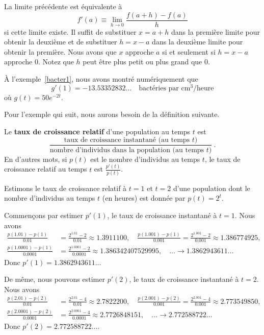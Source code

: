 {\begin{defn}
La limite précédente est équivalente à
\[
f'(a) \equiv \lim_{h\rightarrow 0} \frac{f(a+h) - f(a)}{h}
\]
si cette limite existe.  Il suffit de substituer $x=a+h$ dans la
première limite pour obtenir la deuxième et de substituer $h=x-a$ dans
la deuxième limite pour obtenir la première.  Nous avons que $x$
approche $a$ si et seulement si $h=x-a$ approche $0$.  Notez que $h$
peut être plus petit ou plus grand que $0$.
\end{defn}

\begin{egg}
À l'exemple~\ref{bacter1}, nous avons montré numériquement que
\[
g'(1) = -13.53352832\ldots \quad \text{bactéries par cm$^3$/heure}
\]
où $g(t) = 50 e^{-2t}$.
\end{egg}

Pour l'exemple qui suit, nous aurons besoin de la définition suivante.

\begin{defn} 
Le {\bfseries taux de croissance relatif} d'une population au temps
$t$ est
\[
\frac{\text{taux de croissance instantané (au temps $t$)}}
{\text{nombre d'individus dans la population (au temps $t$)}}
\ .
\]
En d'autres mots, si $p(t)$ est le nombre d'individus au temps $t$, le
taux de croissance relatif au temps $t$ est
$\displaystyle \frac{p'(t)}{p(t)}$.
\end{defn}

\begin{egg}
Estimons le taux de croissance relatif à $t=1$ et $t=2$ d'une
population dont le nombre d'individus au temps $t$ (en heures) est
donnée par $p(t) = 2^t$.

Commençons par estimer $p'(1)$, le taux de croissance instantané à
$t=1$.  Nous avons
\begin{align*}
\frac{p(1.01)-p(1)}{0.01} &= \frac{2^{1.01} - 2}{0.01} \approx 1.3911100,
\quad \frac{p(1.001)-p(1)}{0.001} = \frac{2^{1.001} - 2}{0.001} \approx
1.386774925, \\
\frac{p(1.0001)-p(1)}{0.0001} &= \frac{2^{1.0001} - 2}{0.0001} \approx
1.386342407529995, \quad \ldots 
\to 1.3862943611\ldots
\end{align*}
Donc $p'(1)=1.3862943611\ldots$

De même, nous pouvons estimer $p'(2)$, le taux de croissance instantané à
$t=2$.  Nous avons
\begin{align*}
\frac{p(2.01)-p(2)}{0.01} &= \frac{2^{2.01} - 4}{0.01} \approx 2.7822200,
\quad \frac{p(2.001)-p(2)}{0.001} = \frac{2^{2.001} - 4}{0.001} \approx
2.773549850, \\
\frac{p(2.0001)-p(2)}{0.0001} &= \frac{2^{2.0001} - 4}{0.0001} \approx
2.7726848151 , \quad \ldots 
\to 2.772588722\ldots
\end{align*}
Donc $p'(2) = 2.772588722\ldots$.


\end{egg}}
